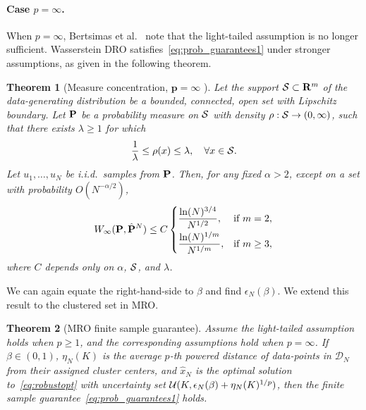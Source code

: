 \documentclass[12pt]{article}
\theoremstyle{thmstyleone}%
\newtheorem{theorem}{Theorem}%
\theoremstyle{thmstyletwo}%
\theoremstyle{thmstylethree}%
\begin{document}
\paragraph{Case $p = \infty$.} When $p = \infty$, Bertsimas et al.~\cite[Section 6]{wass-p-1} note that the light-tailed assumption is no longer sufficient.
Wasserstein \gls {DRO} satisfies~\eqref{eq:prob_guarantees1} under stronger assumptions, as given in the following theorem.
\begin{theorem}[Measure concentration, $\mathbf{p = \infty}$ {\cite[Theorem 1.1]{wass-p-guarantee}}]
\label{theorem-inf}
	Let the support $\mathcal{S} \subset {\mathbf R}^m$ of the data-generating distribution be a bounded, connected, open set with Lipschitz boundary.
	Let ${\mathbf P}$ be a probability measure on $\mathcal{S}$ with density $\rho : \mathcal{S} \rightarrow (0,\infty)$, such that there exists $\lambda \geq 1$ for which
	\begin{equation*}
		\frac{1}{\lambda} \leq \rho(x) \leq \lambda, \quad \forall x \in \mathcal{S}.
	\end{equation*}
	Let $u_1, \ldots, u_N$ be i.i.d.\ samples from ${\mathbf P}$.
	Then, for any fixed $\alpha > 2$, except on a set with probability $O(N^{-\alpha/2})$,
	\begin{equation*}
		W_\infty({\mathbf P}, \hat{{\mathbf P}}^N) \leq C
		\begin{cases}
			\dfrac{\ln(N)^{3/4}}{N^{1/2}}, & \text{if } m = 2, \\[6pt]
			\dfrac{\ln(N)^{1/m}}{N^{1/m}}, & \text{if } m \geq 3,
		\end{cases}
	\end{equation*}
	where $C$ depends only on $\alpha$, $\mathcal{S}$, and $\lambda$.
\end{theorem}
We can again equate the right-hand-side to $\beta$ and find  $\epsilon_N(\beta)$. We extend this result to the clustered set in \gls{MRO}.

\begin{theorem}[\gls{MRO} finite sample guarantee] \label{theorem_mro} Assume the light-tailed assumption holds when $p \geq 1$, and the corresponding assumptions hold when $p = \infty$. If ${\beta \in (0,1)}$, $\eta_N(K)$ is the average $p$-th powered distance of data-points in $\mathcal{D}_N$ from their assigned cluster centers, and $\hat{x}_N$ is the optimal solution to~\eqref{eq:robustopt} with uncertainty set ${\mathcal{U}}(K,\epsilon_N(\beta) + \eta_N(K)^{1/p})$, then the finite sample guarantee~\eqref{eq:prob_guarantees1} holds.
\end{theorem}
\end{document}
